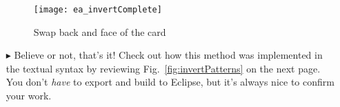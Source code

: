 \begin{itemize}
\begin{figure}[htbp]
\begin{center}
  \texttt{[image: ea\_invertComplete]}
  \caption{Swap back and face of the card}  
  \label{fig:sdm_invertComplete}
\end{center}
\end{figure}

\vspace{0.5cm}

\item[$\blacktriangleright$] Believe or not, that's it! Check out how this method was implemented in the textual syntax by reviewing
Fig.~\ref{fig:invertPatterns} on the next page. You don't \emph{have} to export and build to Eclipse, but it's always nice to confirm your work.


\end{itemize}
